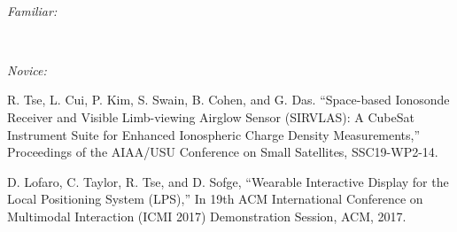 \documentclass[10pt,a4paper,ragged2e,withhyper]{altacv}
\begin{document}
\begin{paracol}{2}
      \\

\divider

\textit{Familiar:}

\vspace{0.125cm}

          \cvtag{\LaTeX} \\

\divider

\textit{Novice:}

\vspace{0.125cm}

   

\vspace{0.25cm}

\renewcommand\refname{\vskip -1cm}


\vspace{-0.25cm}

\begin{thebibliography}{2}
R. Tse, L. Cui, P. Kim, S. Swain, B. Cohen, and G. Das. “Space-based Ionosonde Receiver and Visible Limb-viewing Airglow Sensor (SIRVLAS): A CubeSat Instrument Suite for Enhanced Ionospheric Charge Density Measurements,” Proceedings of the AIAA/USU Conference on Small Satellites, SSC19-WP2-14.

D. Lofaro, C. Taylor, R. Tse, and D. Sofge, “Wearable Interactive Display for the Local Positioning System (LPS),” In 19th ACM International Conference on Multimodal Interaction (ICMI 2017) Demonstration Session, ACM, 2017.

\end{thebibliography}

\end{paracol}
\end{document}
